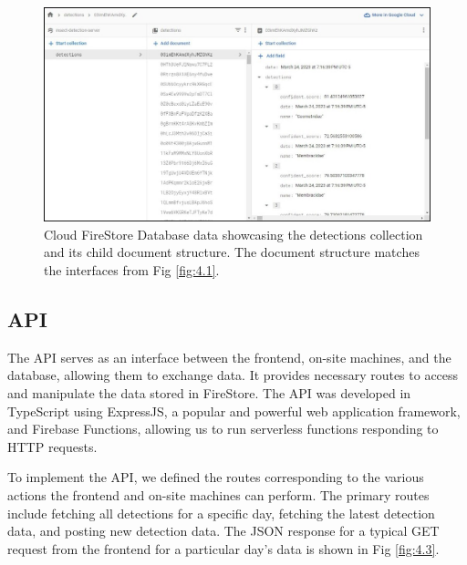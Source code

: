 \begin{figure}[H]
\begin{center}
\includegraphics[width=1.0\linewidth]{Honors_Thesis/Figures/4.2.jpg}
\end{center}
\caption{Cloud FireStore Database data showcasing the detections collection and its child document structure. The document structure matches the interfaces from Fig \ref{fig:4.1}.}
\label{fig:4.2}
\end{figure}

\subsection{API}

The API serves as an interface between the frontend, on-site machines, and the database, allowing them to exchange data. It provides necessary routes to access and manipulate the data stored in FireStore. The API was developed in TypeScript using ExpressJS, a popular and powerful web application framework, and Firebase Functions, allowing us to run serverless functions responding to HTTP requests.

To implement the API, we defined the routes corresponding to the various actions the frontend and on-site machines can perform. The primary routes include fetching all detections for a specific day, fetching the latest detection data, and posting new detection data. The JSON response for a typical GET request from the frontend for a particular day's data is shown in Fig \ref{fig:4.3}. 

